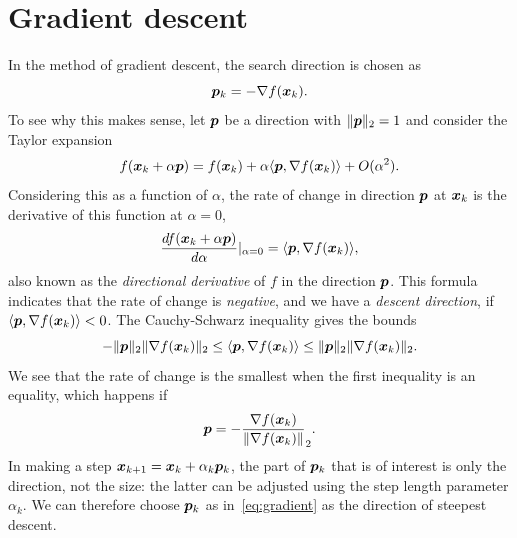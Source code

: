 \section{Gradient descent} In the method of gradient descent, the search direction is chosen as
\begin{equation}\label{eq:gradient}
 \bm{p}_k = -\nabla f(\bm{x}_k).
\end{equation}
To see why this makes sense, let $\bm{p}$ be a direction with $\Vert {\bm{p}}\Vert_2=1$ and consider the Taylor expansion
\begin{equation*}
 f(\bm{x}_k+\alpha \bm{p}) = f(\bm{x}_k)+\alpha \langle {\bm{p}}, {\nabla f(\bm{x}_k)} \rangle+O(\alpha^2).
\end{equation*}
Considering this as a function of $\alpha$, the rate of change in direction $\bm{p}$ at $\bm{x}_k$ is the derivative of this function at $\alpha=0$,
\begin{equation*}
 \frac{df(\bm{x}_k+\alpha \bm{p})}{d\alpha}|_{\alpha=0} = \langle {\bm{p}}, {\nabla f(\bm{x}_k)} \rangle,
\end{equation*}
also known as the {\em directional derivative} of $f$ in the direction $\bm{p}$.
This formula indicates that the rate of change is {\em negative}, and we have a {\em descent direction}, if $\langle {\bm{p}}, {\nabla f(\bm{x}_k)} \rangle<0$. The Cauchy-Schwarz inequality gives the bounds
\begin{equation*}
 -\Vert {\bm{p}}\Vert_2 \Vert {\nabla f(\bm{x}_k)}\Vert_2 \leq \langle {\bm{p}}, {\nabla f(\bm{x}_k)} \rangle \leq \Vert {\bm{p}}\Vert_2 \Vert {\nabla f(\bm{x}_k)}\Vert_2.
\end{equation*}
We see that the rate of change is the smallest when the first inequality is an equality, which happens if 
\begin{equation*}
 \bm{p} = -\frac{\nabla f(\bm{x}_k)}{\Vert {\nabla f(\bm{x}_k)}\Vert}_2.
\end{equation*}
In making a step $\bm{x}_{k+1}=\bm{x}_k+\alpha_k\bm{p}_k$, the part of $\bm{p}_k$ that is of interest is only the direction, not the size: the latter can be adjusted using the step length parameter $\alpha_k$. We can therefore choose $\bm{p}_k$ as in~\eqref{eq:gradient} as the direction of steepest descent.

